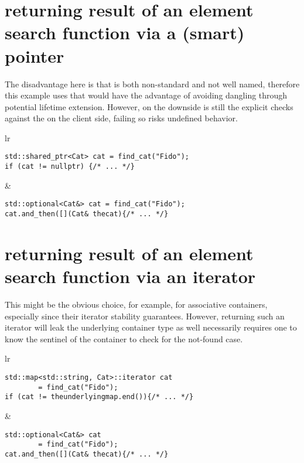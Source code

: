 \documentclass[a4paper,10pt,oneside,openany,final,article]{memoir}
\begin{document}
\section{returning result of an element search function via a (smart) pointer}

The disadvantage here is that  is both non-standard and not well named, therefore this example uses  that would have the advantage of avoiding dangling through potential lifetime extension.
However, on the downside is still the explicit checks against the  on the client side, failing so risks undefined behavior.

  \begin{tabular}{ lr }
  \begin{minipage}[t]{0.45\columnwidth}
    \begin{verbatim}
std::shared_ptr<Cat> cat = find_cat("Fido");
if (cat != nullptr) {/* ... */}

    \end{verbatim}
  \end{minipage}
  &
    \begin{minipage}[t]{0.45\columnwidth}
      \begin{verbatim}
std::optional<Cat&> cat = find_cat("Fido");
cat.and_then([](Cat& thecat){/* ... */}

      \end{verbatim}
    \end{minipage}
  \end{tabular}
  \section{returning result of an element search function via an iterator}

  This might be the obvious choice, for example, for associative containers, especially since their iterator stability guarantees.
  However, returning such an iterator will leak the underlying container type as well necessarily requires one to know the sentinel of the container to check for the not-found case.

  \begin{tabular}{ lr }
  \begin{minipage}[t]{0.45\columnwidth}
    \begin{verbatim}
std::map<std::string, Cat>::iterator cat
        = find_cat("Fido");
if (cat != theunderlyingmap.end()){/* ... */}

    \end{verbatim}
  \end{minipage}
  &
    \begin{minipage}[t]{0.45\columnwidth}
      \begin{verbatim}
std::optional<Cat&> cat
        = find_cat("Fido");
cat.and_then([](Cat& thecat){/* ... */}

      \end{verbatim}
    \end{minipage}
  \end{tabular}
\end{document}
